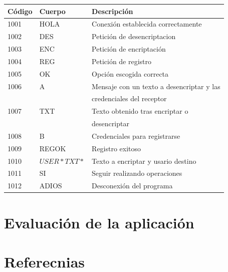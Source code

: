 \documentclass[11pt]{article}
\begin{document}
\begin{table}[h]
\centering
\begin{tabular}{|l|l|l|}
\hline
{Código} & {Cuerpo} & {Descripción}                        \\ \hline
1001                          & HOLA                          & Conexión establecida correctamente                        \\ \hline
1002                          & DES                           & Petición de desencriptacion                                     \\ \hline
1003                          & ENC                           & Petición de encriptación                                       \\ \hline
1004                          & REG                           & Petición de registro                                      \\ \hline
1005                          & OK                        	  & Opción escogida correcta                                      \\ \hline
1006                          & A                             & Mensaje con un texto a desencriptar y las\\  
							  & 							  & credenciales del receptor                                 \\ \hline
1007                          & TXT                           & Texto obtenido tras encriptar o \\
							  &                               &desencriptar \\ \hline
1008                          & B                         	  & Credenciales para registrarse                             \\ \hline
1009                          & REGOK                         & Registro exitoso                               \\ \hline
1010                          & $USER*TXT*$                   & Texto a encriptar y usario destino                            \\ \hline
1011                          & SI                            & Seguir realizando operaciones                                   \\ \hline
1012                          & ADIOS                         & Desconexión del programa                                  \\ \hline
\end{tabular}
\end{table}

\newpage
\section{Evaluaci\'on de la aplicaci\'on}
\newpage
\section{Referecnias}
\end{document}
